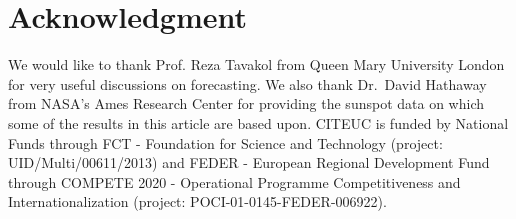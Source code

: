 \documentclass[journal]{IEEEtran}
\begin{document}



\section*{Acknowledgment}
We would like to thank Prof. Reza Tavakol from Queen Mary University London for very useful discussions on forecasting. We also thank
Dr.\ David Hathaway from NASA's Ames Research Center for providing the sunspot data on which some of the results in this article are based upon.
CITEUC is funded by National Funds through FCT - Foundation for Science
and Technology (project: UID/Multi/00611/2013) and FEDER - European
Regional Development Fund through
COMPETE 2020 - Operational Programme Competitiveness and
Internationalization (project: POCI-01-0145-FEDER-006922).

\ifCLASSOPTIONcaptionsoff
  \newpage
\fi




\end{document}
